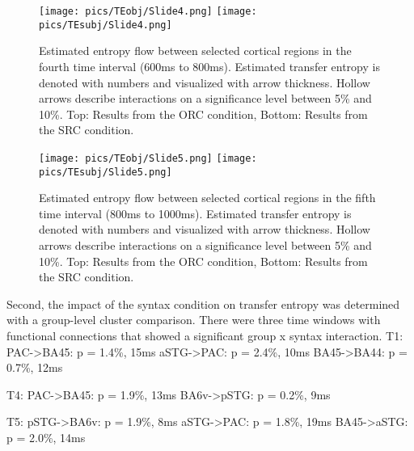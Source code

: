 \begin{figure}[h]
	\begin{center}
		\begin{minipage}{\textwidth}
			\texttt{[image: pics/TEobj/Slide4.png]}
			\texttt{[image: pics/TEsubj/Slide4.png]}
		\end{minipage}
	\caption{\label{4.4.networkgraph.d} Estimated entropy flow between selected cortical regions in the fourth time interval (600ms to 800ms). Estimated transfer entropy is denoted with numbers and visualized with arrow thickness. Hollow arrows describe interactions on a significance level between 5\% and 10\%. Top: Results from the ORC condition, Bottom: Results from the SRC condition.}
	\end{center}
\end{figure}
\vspace{5mm}

\begin{figure}[h]
	\begin{center}
		\begin{minipage}{\textwidth}
			\texttt{[image: pics/TEobj/Slide5.png]}
			\texttt{[image: pics/TEsubj/Slide5.png]}
		\end{minipage}
	\caption{\label{4.4.networkgraph.e} Estimated entropy flow between selected cortical regions in the fifth time interval (800ms to 1000ms). Estimated transfer entropy is denoted with numbers and visualized with arrow thickness. Hollow arrows describe interactions on a significance level between 5\% and 10\%. Top: Results from the ORC condition, Bottom: Results from the SRC condition.}
	\end{center}
\end{figure}
\vspace{5mm}

Second, the impact of the syntax condition on transfer entropy was determined with a group-level cluster comparison.
There were three time windows with functional connections that showed a significant group x syntax interaction.
T1:
PAC->BA45: p = 1.4\%, 15ms
aSTG->PAC: p = 2.4\%, 10ms
BA45->BA44: p = 0.7\%, 12ms

T4:
PAC->BA45: p = 1.9\%, 13ms
BA6v->pSTG: p = 0.2\%, 9ms

T5:
pSTG->BA6v: p = 1.9\%, 8ms
aSTG->PAC: p = 1.8\%, 19ms
BA45->aSTG: p = 2.0\%, 14ms